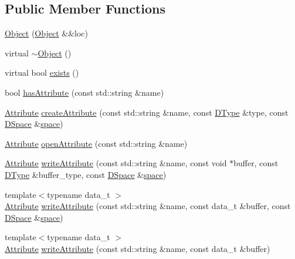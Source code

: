 \subsection*{Public Member Functions}
\begin{DoxyCompactItemize}
\item 
\hyperlink{class_h5_t_l_1_1_object_ab4e2a0eb603b800ef2166050b0675270}{Object} (\hyperlink{class_h5_t_l_1_1_object}{Object} \&\&loc)
\item 
virtual \hyperlink{class_h5_t_l_1_1_object_a8010c2daf63f2040fab6301f34285159}{$\sim$\-Object} ()
\item 
virtual bool \hyperlink{class_h5_t_l_1_1_object_a2754b17af0171db4213ff3471f43735e}{exists} ()
\item 
bool \hyperlink{class_h5_t_l_1_1_object_aa30a49c0c7cef0c84c1b2a8ea281e191}{has\-Attribute} (const std\-::string \&name)
\item 
\hyperlink{class_h5_t_l_1_1_attribute}{Attribute} \hyperlink{class_h5_t_l_1_1_object_a33796a47bc89d5296c62e979480a650a}{create\-Attribute} (const std\-::string \&name, const \hyperlink{class_h5_t_l_1_1_d_type}{D\-Type} \&type, const \hyperlink{class_h5_t_l_1_1_d_space}{D\-Space} \&\hyperlink{namespace_h5_t_l_ae09d3a5b75f86dad261e807592fee081}{space})
\item 
\hyperlink{class_h5_t_l_1_1_attribute}{Attribute} \hyperlink{class_h5_t_l_1_1_object_ab22f9aa2fa49a3a69a88e92612e31d2a}{open\-Attribute} (const std\-::string \&name)
\item 
\hyperlink{class_h5_t_l_1_1_attribute}{Attribute} \hyperlink{class_h5_t_l_1_1_object_a78d80a9f9e9423d1d57c3b6a31900a32}{write\-Attribute} (const std\-::string \&name, const void $\ast$buffer, const \hyperlink{class_h5_t_l_1_1_d_type}{D\-Type} \&buffer\-\_\-type, const \hyperlink{class_h5_t_l_1_1_d_space}{D\-Space} \&\hyperlink{namespace_h5_t_l_ae09d3a5b75f86dad261e807592fee081}{space})
\item 
{\footnotesize template$<$typename data\-\_\-t $>$ }\\\hyperlink{class_h5_t_l_1_1_attribute}{Attribute} \hyperlink{class_h5_t_l_1_1_object_adc6638b07f5ea389c7cd507837b0c0be}{write\-Attribute} (const std\-::string \&name, const data\-\_\-t \&buffer, const \hyperlink{class_h5_t_l_1_1_d_space}{D\-Space} \&\hyperlink{namespace_h5_t_l_ae09d3a5b75f86dad261e807592fee081}{space})
\item 
{\footnotesize template$<$typename data\-\_\-t $>$ }\\\hyperlink{class_h5_t_l_1_1_attribute}{Attribute} \hyperlink{class_h5_t_l_1_1_object_ac17e32f04e0626a107f15bc9cf076214}{write\-Attribute} (const std\-::string \&name, const data\-\_\-t \&buffer)

\end{DoxyCompactItemize}
